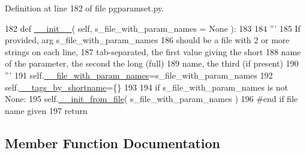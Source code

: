 Definition at line 182 of file pgparamset.\+py.


\begin{DoxyCode}
182     \textcolor{keyword}{def }\hyperlink{classnegui_1_1pgparamset_1_1PGParamSet_a598ea6a166f56fe5be01f86d4d8c91ba}{\_\_init\_\_}( self, s\_file\_with\_param\_names = None ):
183 
184         \textcolor{stringliteral}{'''}
185 \textcolor{stringliteral}{        If provided, arg s\_file\_with\_param\_names}
186 \textcolor{stringliteral}{        should be a file with 2 or more strings on each line,}
187 \textcolor{stringliteral}{        tab-separated, the first value giving the short}
188 \textcolor{stringliteral}{        name of the parameter, the second the long (full)}
189 \textcolor{stringliteral}{        name, the third (if present)}
190 \textcolor{stringliteral}{        '''}
191         self.\hyperlink{classnegui_1_1pgparamset_1_1PGParamSet_aafa67026a09aa523151728cba95e0d6d}{\_\_file\_with\_param\_names}=s\_file\_with\_param\_names
192         self.\hyperlink{classnegui_1_1pgparamset_1_1PGParamSet_aa13eaff9049bc16fa4090c8b85915f3c}{\_\_tags\_by\_shortname}=\{\}
193 
194         \textcolor{keywordflow}{if} s\_file\_with\_param\_names \textcolor{keywordflow}{is} \textcolor{keywordflow}{not} \textcolor{keywordtype}{None}:
195             self.\hyperlink{classnegui_1_1pgparamset_1_1PGParamSet_abc19f133ab3ecc86ec8099549b0b45bb}{\_\_init\_from\_file}( s\_file\_with\_param\_names )
196         \textcolor{comment}{#end if file name given}
197         \textcolor{keywordflow}{return}
\end{DoxyCode}


\subsection{Member Function Documentation}
